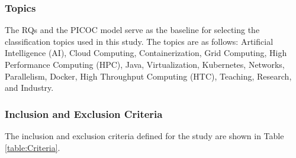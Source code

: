 \subsubsection{Topics}
The RQs and the PICOC model serve as the baseline for selecting the classification topics used in this study. The topics are as follows: Artificial Intelligence (AI), Cloud Computing, Containerization, Grid Computing, High Performance Computing (HPC), Java, Virtualization, Kubernetes, Networks, Parallelism, Docker, High Throughput Computing (HTC), Teaching, Research, and Industry.

\subsubsection{Inclusion and Exclusion Criteria}
The inclusion and exclusion criteria defined for the study are shown in Table \ref{table:Criteria}.

